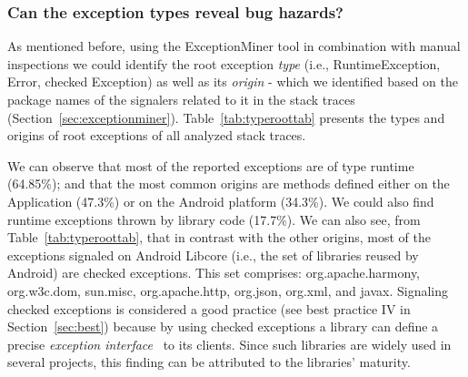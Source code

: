 
\bigskip 


\subsubsection{Can the exception types reveal bug hazards?}

As mentioned before, using the ExceptionMiner tool in combination with manual inspections we could identify
the root exception \emph{type} (i.e., RuntimeException, Error, checked Exception) as well as its \emph{origin} - which we 
identified based on the package names of the signalers related to it in the stack traces (Section~\ref{sec:exceptionminer}).
Table~\ref{tab:typeroottab} presents the types and origins of root exceptions of all analyzed stack traces. 

We can observe that most of the reported exceptions are of type runtime 
(64.85\%); and that the most common origins are methods defined either on the Application (47.3\%)
or on the Android platform (34.3\%). We could also find runtime exceptions thrown by library code (17.7\%).
 We can also see, from Table~\ref{tab:typeroottab}, that in contrast with the other origins, most of the 
 exceptions signaled on Android Libcore (i.e., the set of libraries reused by Android) are 
checked exceptions. This set comprises: org.apache.harmony, org.w3c.dom, sun.misc, 
org.apache.http, org.json, org.xml, and javax. Signaling checked exceptions is considered a 
good practice (see best practice IV in Section~\ref{sec:best}) because by using 
checked exceptions a library can define a precise 
\emph{exception interface}~\cite{miller1997issues} to its clients.
 Since such libraries are widely used  in several projects, this
 finding can be attributed to the libraries' maturity.

